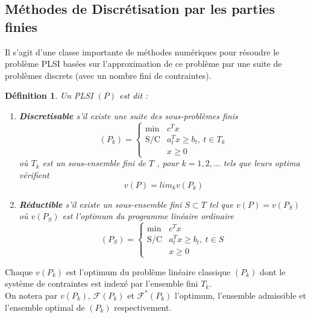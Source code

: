 \documentclass[11pt]{report}
\newenvironment{boxdefinition}
{\begin{tcolorbox}
		[enhanced jigsaw,breakable,pad at break*=1mm,
		colback=black!5!white,boxrule=0pt,frame hidden,
		borderline west={1.5mm}{-2mm}{blue}]}
	{\end{tcolorbox}}
\theoremstyle{styletheorem}
\theoremstyle{styledef}
\newtheorem{definitions}[theoreme]{Définition}
\theoremstyle{remark}
\newenvironment{definition}{\vspace*{0.3cm}\begin{boxdefinition}\begin{definitions}}{\end{definitions}\end{boxdefinition}\vspace*{0.3cm}}
\begin{document}
\subsection*{Méthodes de Discrétisation par les parties finies}
Il s'agit d'une classe importante de méthodes numériques pour résoudre le problème PLSI basées sur l'approximation de ce problème par une suite de problèmes discrets (avec un nombre fini de contraintes). 
\begin{definition}
	Un PLSI $(P)$ est dit :
	\begin{enumerate}
		\item \textbf{Discretisable} s'il existe une suite des sous-problèmes finis \begin{equation}\label{disc1}
			(P_k) = \left \lbrace \begin{array}{ll}
				\text{min}& c^Tx\\
				\text{S/C} & a^T_t x \geq b_t, \ t  \in T_k\\
				& x\geq 0
			\end{array}\right. 
		\end{equation}
		où $T_k$ est un sous-ensemble fini de $T$ , pour $k=1,2,\dots$ tels que leurs optima vérifient \begin{equation}\label{key}
			v(P) = lim_k v(P_k)
		\end{equation} 
		
		\item \textbf{Réductible} s'il existe un sous-ensemble fini $S\subset T$ tel que $v(P)=v(P_S)$ où $v(P_S)$ est l'optimum du programme linéaire ordinaire \begin{equation}\label{disc1111}
			(P_S) = \left \lbrace \begin{array}{ll}
				\text{min}& c^Tx\\
				\text{S/C} & a^T_t x \geq b_t, \ t  \in S\\
				& x\geq 0
			\end{array}\right. 
		\end{equation}
	\end{enumerate} 
\end{definition}
Chaque $v(P_k)$ est l'optimum du problème linéaire classique $(P_k)$ dont le système de contraintes est indexé par l'ensemble fini $T_k$.\\

On notera par $v(P_k)$, $\mathcal{F}(P_k)$ et $\mathcal{F}^*(P_k)$ l'optimum, l'ensemble admissible et l'ensemble optimal de $(P_k)$ respectivement.\\
\end{document}
